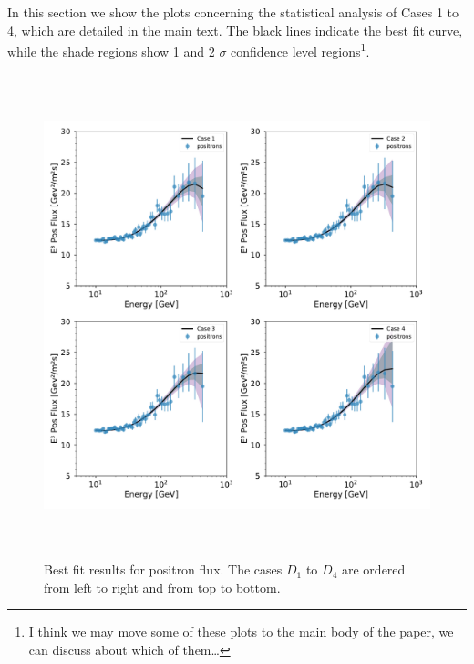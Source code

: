 \documentclass[a4paper,11pt]{article}
\begin{document}
In this section we show the plots concerning the statistical analysis of Cases 1 to 4, which are detailed in the main text. The black lines indicate the best fit curve, while the shade regions show 1 and 2 $\sigma$ confidence level regions\footnote{I think we may move some of these plots to the main body of the paper, we can discuss about which of them…}.

\begin{figure}[!h]
\begin{center}
\includegraphics[height=14cm,width=14cm,angle=0]{Figures/pymultinest_fit_case_5_positron_flux.pdf}
\caption{Best fit results for positron flux. The cases $D_1$ to $D_4$ are ordered from left to right and from top to bottom.}
\label{fig:bf-positron-spectrum}
\end{center}
\end{figure}
\end{document}
